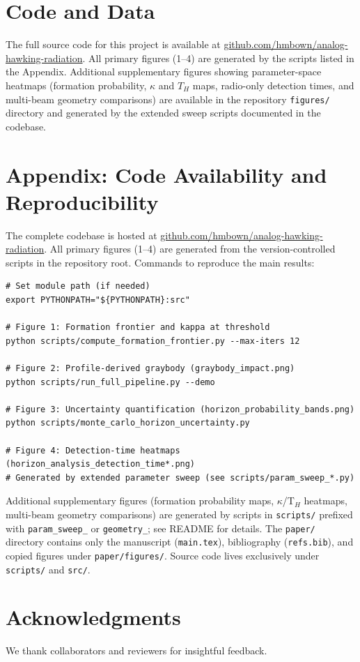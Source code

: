 \documentclass[11pt]{article}
\begin{document}
\section{Code and Data}
The full source code for this project is available at \href{https://github.com/hmbown/analog-hawking-radiation}{github.com/hmbown/analog-hawking-radiation}. All primary figures (1--4) are generated by the scripts listed in the Appendix. Additional supplementary figures showing parameter-space heatmaps (formation probability, $\kappa$ and $T_H$ maps, radio-only detection times, and multi-beam geometry comparisons) are available in the repository \texttt{figures/} directory and generated by the extended sweep scripts documented in the codebase.

\appendix
\section*{Appendix: Code Availability and Reproducibility}
The complete codebase is hosted at \href{https://github.com/hmbown/analog-hawking-radiation}{github.com/hmbown/analog-hawking-radiation}. All primary figures (1--4) are generated from the version-controlled scripts in the repository root. Commands to reproduce the main results:
\begin{verbatim}
# Set module path (if needed)
export PYTHONPATH="${PYTHONPATH}:src"

# Figure 1: Formation frontier and kappa at threshold
python scripts/compute_formation_frontier.py --max-iters 12

# Figure 2: Profile-derived graybody (graybody_impact.png)
python scripts/run_full_pipeline.py --demo

# Figure 3: Uncertainty quantification (horizon_probability_bands.png)
python scripts/monte_carlo_horizon_uncertainty.py

# Figure 4: Detection-time heatmaps (horizon_analysis_detection_time*.png)
# Generated by extended parameter sweep (see scripts/param_sweep_*.py)
\end{verbatim}
Additional supplementary figures (formation probability maps, $\kappa$/T$_H$ heatmaps, multi-beam geometry comparisons) are generated by scripts in \texttt{scripts/} prefixed with \texttt{param\_sweep\_} or \texttt{geometry\_}; see README for details. The \texttt{paper/} directory contains only the manuscript (\texttt{main.tex}), bibliography (\texttt{refs.bib}), and copied figures under \texttt{paper/figures/}. Source code lives exclusively under \texttt{scripts/} and \texttt{src/}.

\section*{Acknowledgments}
We thank collaborators and reviewers for insightful feedback.



\end{document}
